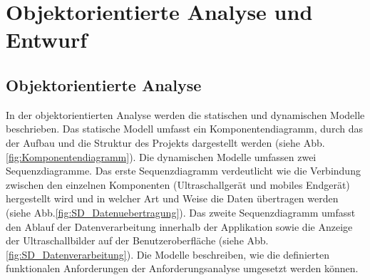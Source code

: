 \chapter{Objektorientierte Analyse und Entwurf}
\section{Objektorientierte Analyse}
In der objektorientierten Analyse werden die statischen und dynamischen Modelle beschrieben. Das statische Modell umfasst ein Komponentendiagramm, durch das der Aufbau und die Struktur des Projekts dargestellt werden (siehe Abb. \ref{fig:Komponentendiagramm}). Die dynamischen Modelle umfassen zwei Sequenzdiagramme. Das erste Sequenzdiagramm verdeutlicht wie die Verbindung zwischen den einzelnen Komponenten (Ultraschallgerät und mobiles Endgerät) hergestellt wird und in welcher Art und Weise die Daten übertragen werden (siehe Abb.\ref{fig:SD_Datenuebertragung}). Das zweite Sequenzdiagramm umfasst den Ablauf der Datenverarbeitung innerhalb der Applikation sowie die Anzeige der Ultraschallbilder auf der Benutzeroberfläche (siehe Abb. \ref{fig:SD_Datenverarbeitung}). Die Modelle beschreiben, wie die definierten funktionalen Anforderungen der Anforderungsanalyse umgesetzt werden können. 
